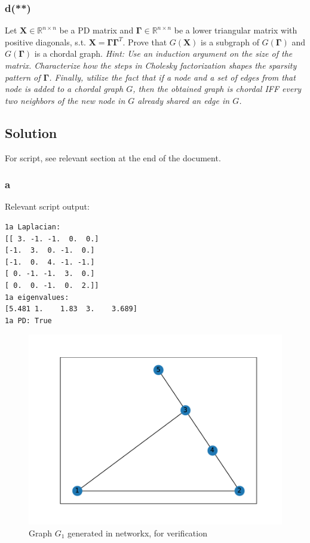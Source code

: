 \documentclass[11pt]{report}
\theoremstyle{definition}
\newcommand{\mat}[1]{\mathbf{#1}}
\begin{document}
\subsubsection*{d(**)}
Let $\mat{X}\in\mathbb{R}^{n\times n}$ be a PD matrix and
$\mat{\Gamma}\in\mathbb{R}^{n\times n}$ be a lower triangular matrix with
positive diagonals, s.t. $\mat{X}=\mat{\Gamma\Gamma}^T$. Prove that $G(\mat{X})$
is a subgraph of $G(\mat{\Gamma})$ and $G(\mat{\Gamma})$ is a chordal graph.
\textit{Hint: Use an induction argument on the size of the matrix. Characterize
	how the steps in Cholesky factorization shapes the sparsity pattern of
	$\mat{\Gamma}$. Finally, utilize the fact that if a node and a set of edges from
	that node is added to a chordal graph $G$, then the obtained graph is chordal
	IFF every two neighbors of the new node in $G$ already shared an edge in $G$.}

\subsection*{Solution}
For script, see relevant section at the end of the document.

\subsubsection*{a}
Relevant script output:
\begin{lstlisting}[basicstyle=\small]
1a Laplacian:
[[ 3. -1. -1.  0.  0.]
[-1.  3.  0. -1.  0.]
[-1.  0.  4. -1. -1.]
[ 0. -1. -1.  3.  0.]
[ 0.  0. -1.  0.  2.]]
1a eigenvalues:
[5.481 1.    1.83  3.    3.689]
1a PD: True
\end{lstlisting}
\begin{figure}[H]
	\center
	\includegraphics[width=.8\textwidth]{one_a.pdf}
	\caption{Graph $G_1$ generated in networkx, for verification}
\end{figure}
\end{document}
